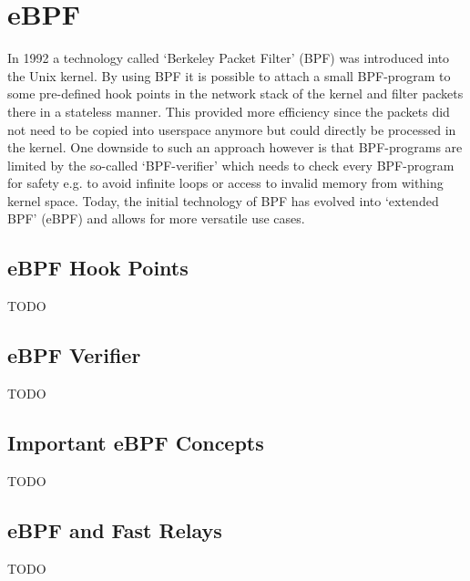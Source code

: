 \section{eBPF}\label{sec:ebpf_bg}
In 1992 a technology called `Berkeley Packet Filter' (BPF) was introduced into 
the Unix kernel.
By using BPF it is possible to attach a small BPF-program to some pre-defined hook points in 
the network stack of the kernel and filter packets there in a stateless manner.
This provided more efficiency since the packets did not need to be copied into 
userspace anymore but could directly be processed in the kernel.
One downside to such an approach however is that BPF-programs are limited by the 
so-called `BPF-verifier' which needs to check every BPF-program for safety e.g. 
to avoid infinite loops or access to invalid memory from withing kernel space. 
Today, the initial technology of BPF has evolved into `extended BPF' (eBPF) and 
allows for more versatile use cases.

\subsection{eBPF Hook Points}
TODO

\subsection{eBPF Verifier}
TODO

\subsection{Important eBPF Concepts}
TODO

\subsection{eBPF and Fast Relays}
TODO
